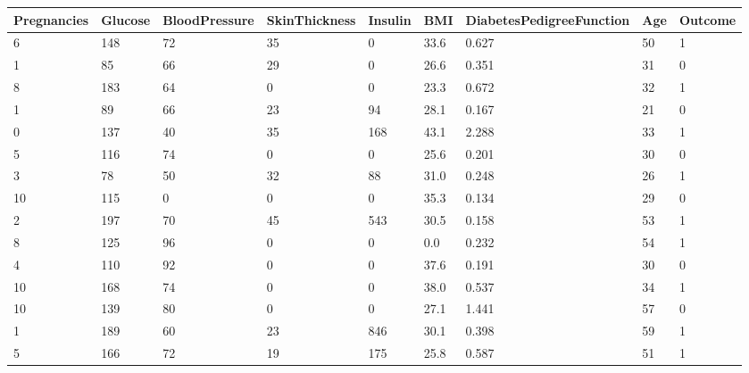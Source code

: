 \documentclass[12pt]{article}
\begin{document}
{
\clearpage
\begin{landscape}
\centering
\begin{table}[]
\centering
\begin{tabular}{|l|l|l|l|l|l|l|l|l|}
\hline
 Pregnancies &  Glucose &  BloodPressure &  SkinThickness &  Insulin &   BMI &  DiabetesPedigreeFunction &  Age &  Outcome \\\hline
           6 &      148 &             72 &             35 &        0 &  33.6 &                     0.627 &   50 &        1 \\\hline
           1 &       85 &             66 &             29 &        0 &  26.6 &                     0.351 &   31 &        0 \\\hline
           8 &      183 &             64 &              0 &        0 &  23.3 &                     0.672 &   32 &        1 \\\hline
           1 &       89 &             66 &             23 &       94 &  28.1 &                     0.167 &   21 &        0 \\\hline
           0 &      137 &             40 &             35 &      168 &  43.1 &                     2.288 &   33 &        1 \\\hline
           5 &      116 &             74 &              0 &        0 &  25.6 &                     0.201 &   30 &        0 \\\hline
           3 &       78 &             50 &             32 &       88 &  31.0 &                     0.248 &   26 &        1 \\\hline
          10 &      115 &              0 &              0 &        0 &  35.3 &                     0.134 &   29 &        0 \\\hline
           2 &      197 &             70 &             45 &      543 &  30.5 &                     0.158 &   53 &        1 \\\hline
           8 &      125 &             96 &              0 &        0 &   0.0 &                     0.232 &   54 &        1 \\\hline
           4 &      110 &             92 &              0 &        0 &  37.6 &                     0.191 &   30 &        0 \\\hline
          10 &      168 &             74 &              0 &        0 &  38.0 &                     0.537 &   34 &        1 \\\hline
          10 &      139 &             80 &              0 &        0 &  27.1 &                     1.441 &   57 &        0 \\\hline
           1 &      189 &             60 &             23 &      846 &  30.1 &                     0.398 &   59 &        1 \\\hline
           5 &      166 &             72 &             19 &      175 &  25.8 &                     0.587 &   51 &        1 \\\hline
\end{tabular}
\end{table}
\label{table:5}
\end{landscape}
\clearpage
}
\end{document}

